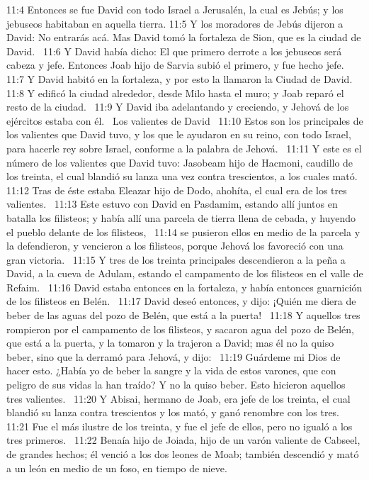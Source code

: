 11:4 Entonces se fue David con todo Israel a Jerusalén, la cual es Jebús; y los jebuseos habitaban en aquella tierra. 
11:5 Y los moradores de Jebús dijeron a David: No entrarás acá. Mas David tomó la fortaleza de Sion, que es la ciudad de David.  
11:6 Y David había dicho: El que primero derrote a los jebuseos será cabeza y jefe. Entonces Joab hijo de Sarvia subió el primero, y fue hecho jefe.  
11:7 Y David habitó en la fortaleza, y por esto la llamaron la Ciudad de David.  
11:8 Y edificó la ciudad alrededor, desde Milo hasta el muro; y Joab reparó el resto de la ciudad.  
11:9 Y David iba adelantando y creciendo, y Jehová de los ejércitos estaba con él.  
Los valientes de David   
11:10 Estos son los principales de los valientes que David tuvo, y los que le ayudaron en su reino, con todo Israel, para hacerle rey sobre Israel, conforme a la palabra de Jehová.  
11:11 Y este es el número de los valientes que David tuvo: Jasobeam hijo de Hacmoni, caudillo de los treinta, el cual blandió su lanza una vez contra trescientos, a los cuales mató.  
11:12 Tras de éste estaba Eleazar hijo de Dodo, ahohíta, el cual era de los tres valientes.  
11:13 Este estuvo con David en Pasdamim, estando allí juntos en batalla los filisteos; y había allí una parcela de tierra llena de cebada, y huyendo el pueblo delante de los filisteos,  
11:14 se pusieron ellos en medio de la parcela y la defendieron, y vencieron a los filisteos, porque Jehová los favoreció con una gran victoria.  
11:15 Y tres de los treinta principales descendieron a la peña a David, a la cueva de Adulam, estando el campamento de los filisteos en el valle de Refaim.  
11:16 David estaba entonces en la fortaleza, y había entonces guarnición de los filisteos en Belén.  
11:17 David deseó entonces, y dijo: ¡Quién me diera de beber de las aguas del pozo de Belén, que está a la puerta!  
11:18 Y aquellos tres rompieron por el campamento de los filisteos, y sacaron agua del pozo de Belén, que está a la puerta, y la tomaron y la trajeron a David; mas él no la quiso beber, sino que la derramó para Jehová, y dijo:  
11:19 Guárdeme mi Dios de hacer esto. ¿Había yo de beber la sangre y la vida de estos varones, que con peligro de sus vidas la han traído? Y no la quiso beber. Esto hicieron aquellos tres valientes.  
11:20 Y Abisai, hermano de Joab, era jefe de los treinta, el cual blandió su lanza contra trescientos y los mató, y ganó renombre con los tres.  
11:21 Fue el más ilustre de los treinta, y fue el jefe de ellos, pero no igualó a los tres primeros.  
11:22 Benaía hijo de Joiada, hijo de un varón valiente de Cabseel, de grandes hechos; él venció a los dos leones de Moab; también descendió y mató a un león en medio de un foso, en tiempo de nieve.  
